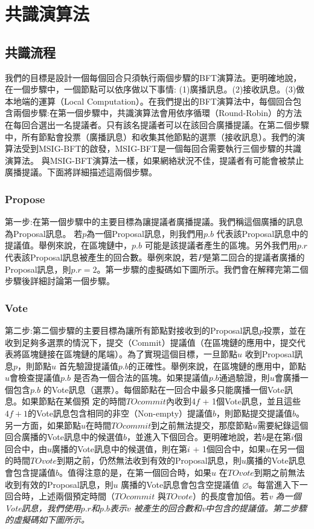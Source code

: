 \chapter{共識演算法}\label{se_3}

\section{共識流程}\label{se_3} 
我們的目標是設計一個每個回合只須執行兩個步驟的BFT演算法。更明確地說，在一個步驟中，一個節點可以依序做以下事情: (1)廣播訊息。(2)接收訊息。(3)做本地端的運算（Local Computation）。在我們提出的BFT演算法中，每個回合包含兩個步驟:在第一個步驟中，共識演算法會用依序循環（Round-Robin）的方法在每回合選出一名提議者。只有該名提議者可以在該回合廣播提議。在第二個步驟中，所有節點會投票（廣播訊息）和收集其他節點的選票（接收訊息）。我們的演算法受到MSIG-BFT\cite{chen2018msig}的啟發，MSIG-BFT是一個每回合需要執行三個步驟的共識演算法。 與MSIG-BFT演算法一樣，如果網絡狀況不佳，提議者有可能會被禁止廣播提議。下面將詳細描述這兩個步驟。
%
\subsection{Propose}\label{se_3} 
第一步:在第一個步驟中的主要目標為讓提議者廣播提議。我們稱這個廣播的訊息為Proposal訊息。 若$p$為一個Proposal訊息，則我們用$p.b$ 代表該Proposal訊息中的提議值。舉例來說，在區塊鏈中，$p.b$ 可能是該提議者產生的區塊。另外我們用$p.r$ 代表該Proposal訊息被產生的回合數。舉例來說，若$P$是第二回合的提議者廣播的Proposal訊息，則$p.r = 2$。第一步驟的虛擬碼如下圖所示。我們會在解釋完第二個步驟後詳細討論第一個步驟。


\subsection{Vote}\label{se_3} 
第二步:第二個步驟的主要目標為讓所有節點對接收到的Proposal訊息$p$投票，並在收到足夠多選票的情況下，提交（Commit）提議值（在區塊鏈的應用中，提交代表將區塊鏈接在區塊鏈的尾端）。為了實現這個目標，一旦節點$u$ 收到Proposal訊息$p$，則節點$u$ 首先驗證提議值$p.b$的正確性。舉例來說，在區塊鏈的應用中，節點$u$會檢查提議值$p.b$ 是否為一個合法的區塊。如果提議值$p.b$通過驗證，則$u$會廣播一個包含$p.b$ 的Vote訊息（選票）。每個節點在一回合中最多只能廣播一個Vote訊息。如果節點在某個預 定的時間$TOcommit$內收到4$f$ + 1個Vote訊息，並且這些$4f+1$的Vote訊息包含相同的非空（Non-empty）提議值$b$，則節點提交提議值$b$。另一方面，如果節點$u$在時間$TOcommit$到之前無法提交，那麼節點$u$需要紀錄這個回合廣播的Vote訊息中的候選值$b$，並進入下個回合。更明確地說，若$b$是在第$i$個回合中，由$u$廣播的Vote訊息中的候選值，則在第$i$ + 1個回合中，如果$u$在另一個的時間$TOvote$到期之前，仍然無法收到有效的Proposal訊息，則$u$廣播的Vote訊息會包含提議值$b$。值得注意的是，在第一個回合時，如果$u$ 在$TOvote$到期之前無法收到有效的Proposal訊息，則$u$ 廣播的Vote訊息會包含空提議值 $\varnothing$。每當進入下一回合時，上述兩個預定時間（$TOcommit$ 與$TOvote$）的長度會加倍。若\em v 為一個Vote訊息，我們使用$p.r$和$p.b$表示$v$ 被產生的回合數和\em v中包含的提議值。第二步驟的虛擬碼如下圖所示。


